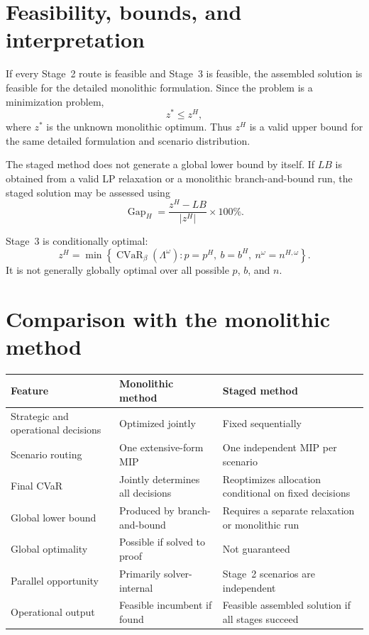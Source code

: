 \documentclass[11pt]{article}
\newcommand{\cvar}{\operatorname{CVaR}}
\begin{document}
\section{Feasibility, bounds, and interpretation}

If every Stage~2 route is feasible and Stage~3 is feasible, the assembled
solution is feasible for the detailed monolithic formulation.  Since the
problem is a minimization problem,
\begin{equation}
z^*\leq z^H,
\label{eq:upper-bound}
\end{equation}
where $z^*$ is the unknown monolithic optimum.  Thus $z^H$ is a valid upper
bound for the same detailed formulation and scenario distribution.

The staged method does not generate a global lower bound by itself.  If $LB$
is obtained from a valid LP relaxation or a monolithic branch-and-bound run,
the staged solution may be assessed using
\begin{equation}
\operatorname{Gap}_H
=
\frac{z^H-LB}{\lvert z^H\rvert}\times100\%.
\label{eq:heuristic-gap}
\end{equation}

Stage~3 is conditionally optimal:
\begin{equation}
z^H
=
\min\left\{
\cvar_\beta(\Lambda^\omega):
p=p^H,\ b=b^H,\ n^\omega=n^{H,\omega}
\right\}.
\end{equation}
It is not generally globally optimal over all possible $p$, $b$, and $n$.

\section{Comparison with the monolithic method}

\begin{center}
\begin{tabular}{p{}p{}p{}}
\toprule
Feature & Monolithic method & Staged method \\
\midrule
Strategic and operational decisions
& Optimized jointly
& Fixed sequentially \\
Scenario routing
& One extensive-form MIP
& One independent MIP per scenario \\
Final CVaR
& Jointly determines all decisions
& Reoptimizes allocation conditional on fixed decisions \\
Global lower bound
& Produced by branch-and-bound
& Requires a separate relaxation or monolithic run \\
Global optimality
& Possible if solved to proof
& Not guaranteed \\
Parallel opportunity
& Primarily solver-internal
& Stage~2 scenarios are independent \\
Operational output
& Feasible incumbent if found
& Feasible assembled solution if all stages succeed \\
\bottomrule
\end{tabular}
\end{center}
\end{document}
